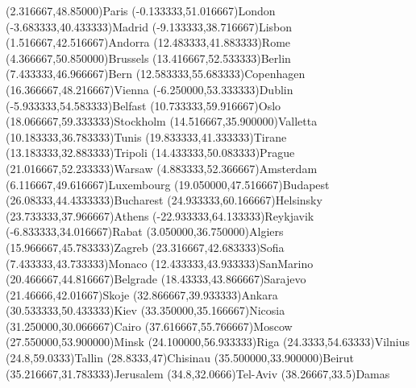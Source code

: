 \mapput[90](2.316667,48.85000){Paris}
\mapput[90](-0.133333,51.016667){London}
\mapput[90](-3.683333,40.433333){Madrid}
\mapput[90](-9.133333,38.716667){Lisbon}
\mapput[90](1.516667,42.516667){Andorra}
\mapput[90](12.483333,41.883333){Rome}
\mapput[40](4.366667,50.850000){Brussels}
\mapput[90](13.416667,52.533333){Berlin}
\mapput[90](7.433333,46.966667){Bern}
\mapput[0](12.583333,55.683333){Copenhagen}
\mapput[90](16.366667,48.216667){Vienna}
\mapput[90](-6.250000,53.333333){Dublin}
\mapput[90](-5.933333,54.583333){Belfast}
\mapput[90](10.733333,59.916667){Oslo}
\mapput[90](18.066667,59.333333){Stockholm}
\mapput[90](14.516667,35.900000){Valletta}
\mapput[90](10.183333,36.783333){Tunis}
\mapput[90](19.833333,41.333333){Tirane}
\mapput[90](13.183333,32.883333){Tripoli}
\mapput[90](14.433333,50.083333){Prague}
\mapput[90](21.016667,52.233333){Warsaw}
\mapput[90](4.883333,52.366667){Amsterdam}
\mapput[-60](6.116667,49.616667){Luxembourg}
\mapput[0](19.050000,47.516667){Budapest}
\mapput[90](26.08333,44.4333333){Bucharest}
\mapput[90](24.933333,60.166667){Helsinsky}
\mapput[90](23.733333,37.966667){Athens}
\mapput[90](-22.933333,64.133333){Reykjavik}
\mapput[90](-6.833333,34.016667){Rabat}
\mapput[90](3.050000,36.750000){Algiers}
\mapput[90](15.966667,45.783333){Zagreb}
\mapput[90](23.316667,42.683333){Sofia}
\mapput[90](7.433333,43.733333){Monaco}
\mapput[90](12.433333,43.933333){SanMarino}
\mapput[90](20.466667,44.816667){Belgrade}
\mapput[90](18.43333,43.866667){Sarajevo}
\mapput[90](21.46666,42.01667){Skoje}
\mapput[90](32.866667,39.933333){Ankara}
\mapput[90](30.533333,50.433333){Kiev}
\mapput[90](33.350000,35.166667){Nicosia}
\mapput[90](31.250000,30.066667){Cairo}
\mapput[90](37.616667,55.766667){Moscow}
\mapput[-90](27.550000,53.900000){Minsk}
\mapput[90](24.100000,56.933333){Riga}
\mapput[90](24.3333,54.63333){Vilnius}
\mapput[90](24.8,59.0333){Tallin}
\mapput[90](28.8333,47){Chisinau}
\mapput[90](35.500000,33.900000){Beirut}
\mapput[0](35.216667,31.783333){Jerusalem}
\mapput[180](34.8,32.0666){Tel-Aviv}
\mapput[90](38.26667,33.5){Damas}
